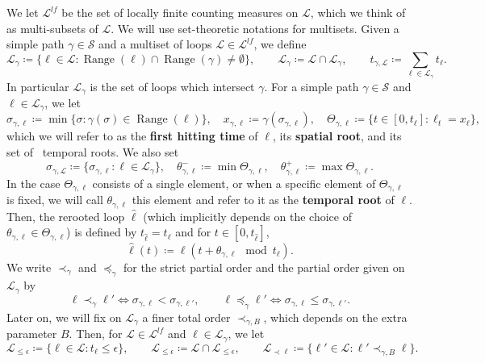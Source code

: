 \documentclass[11pt]{article}
\DeclareMathOperator{\Range}{Range}
\begin{document}
We let $\mathscr{L}^{lf}$ be the set of locally finite counting measures on $\mathscr{L}$, which we think of as multi-subsets of $\mathscr{L}$. We will use set-theoretic notations for multisets. Given a simple path $\gamma\in \mathscr{S}$ and a multiset of loops $\mathcal{L} \in \mathscr{L}^{lf}$, we define
\[
 \mathscr{L}_{\gamma}\coloneqq \{\ell \in \mathscr{L}:\Range(\ell)\cap\Range(\gamma)\neq \emptyset \},\qquad
 \mathcal{L}_{\gamma}\coloneqq \mathcal{L}\cap \mathscr{L}_\gamma,\qquad
t_{\gamma,\mathcal{L}} \coloneqq \sum_{\ell \in \mathcal{L}_{\gamma} } t_\ell.\]
In particular $\mathscr{L}_\gamma$ is the set of loops which intersect $\gamma$.
For a simple path $\gamma\in \mathscr{S}$ and $\ell\in \mathscr{L}_\gamma$, we let
\[ \sigma_{\gamma,\ell}\coloneqq \min \{ \sigma: \gamma(\sigma)\in \Range(\ell)\}, \quad
x_{\gamma,\ell}\coloneqq \gamma(\sigma_{\gamma,\ell}), \quad
 \Theta_{\gamma,\ell}\coloneqq \{ t\in [0,t_\ell]: \ell_t=x_\ell \},\]
which we will refer to as the {\bf first hitting time}  of $\ell$, its { \bf spatial root}, and its set of {\ temporal roots}.
We also set \[
\sigma_{\gamma,\mathcal{L}}\coloneqq \{ \sigma_{\gamma,\ell}: \ell\in \mathcal{L}_\gamma\},\quad
\theta^-_{\gamma,\ell}\coloneqq \min  \Theta_{\gamma,\ell}, \quad \theta^+_{\gamma,\ell}\coloneqq \max  \Theta_{\gamma,\ell}.\]
In the case $\Theta_{\gamma,\ell}$ consists of a single element, or when a specific element of $\Theta_{\gamma,\ell}$ is fixed, we will call $\theta_{\gamma,\ell}$ this element and refer to it as the {\bf temporal root} of $\ell$. Then, the rerooted loop $\hat{\ell}$ (which implicitly depends on the choice of $\theta_{\gamma,\ell}\in\Theta_{\gamma,\ell}$) is defined by $t_{\hat{\ell}}=t_\ell$ and for $t\in [0, t_{\hat{\ell}}]$,
\[\hat{\ell}(t)\coloneqq \ell ( t+\theta_{\gamma,\ell} \mod t_\ell   ).\]
We write $\prec_\gamma$ and $\preceq_\gamma$ for the strict partial order and the partial order given on $\mathscr{L}_{\gamma}$ by
\[ \ell\prec_\gamma \ell' \iff \sigma_{\gamma,\ell} < \sigma_{\gamma,\ell'}, \qquad
\ell\preceq_\gamma \ell' \iff \sigma_{\gamma,\ell} \leq \sigma_{\gamma,\ell'}
.\]
Later on, we will fix on $\mathcal{L}_\gamma$ a finer total order $\prec_{\gamma,B}$, which depends on the extra parameter $B$. Then,
for $\mathcal{L}\in  \mathscr{L}^{lf}$ and $\ell\in \mathcal{L}_\gamma$,
we let
\[
 \mathscr{L}_{\leq \epsilon}\coloneqq \{\ell \in \mathscr{L}: t_\ell\leq \epsilon\},\qquad
  \mathcal{L}_{\leq \epsilon}\coloneqq \mathcal{L}\cap \mathscr{L}_{\leq \epsilon} ,\qquad
 \mathcal{L}_{\prec \ell}\coloneqq \{\ell' \in \mathcal{L}: \ell'\prec_{\gamma,B}\ell\}.\]
\end{document}
